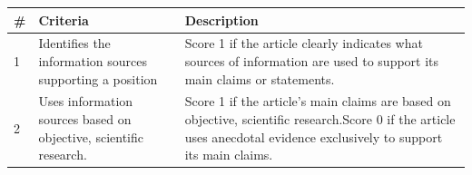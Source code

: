 \documentclass[a4paper,twoside,phd]{BYUPhys}
\begin{document}
\begin{table}[H]
	\centering
	\begin{tabular}{|p{0.3cm}|p{5cm}|p{12cm}|}
		\hline
		\# & Criteria                                                                           & Description                                                                                                                                                                                                                                                                                                                                                             \\
		\hline
		1  & Identifies the information sources supporting a position            & Score 1 if the article clearly indicates what sources of information are used to support its main claims or statements. \\
		\hline
		
		2  & Uses information sources based on objective, scientific research. & Score 1 if the article's main claims are based on objective, scientific research.\newline Score 0 if the article uses anecdotal evidence exclusively to support its main claims.                                                                                                                                                  \\
		\hline
		

\end{tabular}
\end{table}
\end{document}
